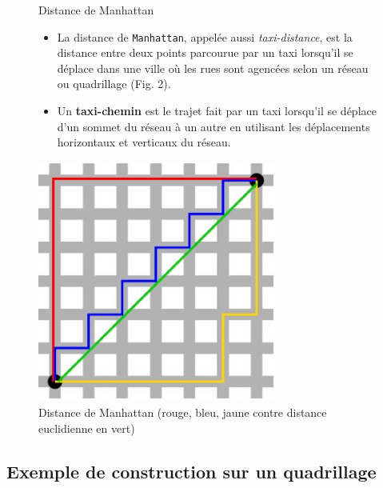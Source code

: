 \begin{figure}[!h]
\begin{minipage}{0.6\textwidth}
\begin{defi}{Distance de Manhattan}
\begin{itemize}
\item La distance de \texttt{Manhattan}, appelée aussi \textit{taxi-distance}, est la distance entre deux points parcourue par un taxi lorsqu'il se déplace dans une ville où les rues sont agencées selon un réseau ou quadrillage (Fig. 2). 
\item Un \textbf{taxi-chemin} est le trajet fait par un taxi lorsqu'il se déplace d'un sommet du réseau à un autre en utilisant les déplacements horizontaux et verticaux du réseau.
\end{itemize}

\end{defi}
\end{minipage}
\begin{minipage}{0.4\textwidth}
\begin{center}
\includegraphics[width=0.7\textwidth]{images/manhattan.jpg}
\caption{Distance de Manhattan (rouge, bleu, jaune contre distance euclidienne en vert)}
\end{center}
\end{minipage}
\end{figure}


\subsection{Exemple de construction sur un quadrillage}

